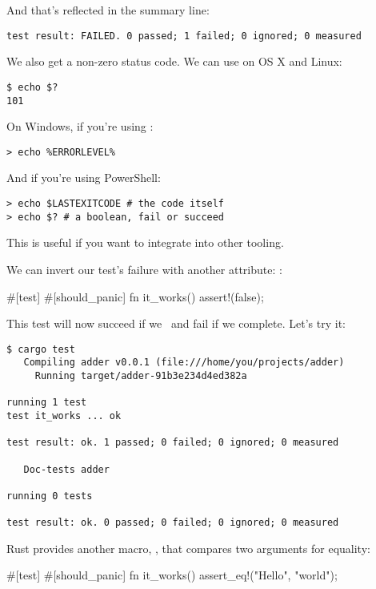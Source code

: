 And that's reflected in the summary line:

\begin{verbatim}
test result: FAILED. 0 passed; 1 failed; 0 ignored; 0 measured
\end{verbatim}

We also get a non-zero status code. We can use  on OS X and Linux:

\begin{verbatim}
$ echo $?
101
\end{verbatim}

On Windows, if you’re using :

\begin{verbatim}
> echo %ERRORLEVEL%
\end{verbatim}

And if you’re using PowerShell:

\begin{verbatim}
> echo $LASTEXITCODE # the code itself
> echo $? # a boolean, fail or succeed
\end{verbatim}

This is useful if you want to integrate  into other tooling.

\blank

We can invert our test's failure with another attribute: :

\begin{rustc}
#[test]
#[should_panic]
fn it_works() {
    assert!(false);
}
\end{rustc}

This test will now succeed if we \panic\ and fail if we complete. Let's try it:

\begin{verbatim}
$ cargo test
   Compiling adder v0.0.1 (file:///home/you/projects/adder)
     Running target/adder-91b3e234d4ed382a

running 1 test
test it_works ... ok

test result: ok. 1 passed; 0 failed; 0 ignored; 0 measured

   Doc-tests adder

running 0 tests

test result: ok. 0 passed; 0 failed; 0 ignored; 0 measured
\end{verbatim}

Rust provides another macro, , that compares two arguments for equality:

\begin{rustc}
#[test]
#[should_panic]
fn it_works() {
    assert_eq!("Hello", "world");
}
\end{rustc}


